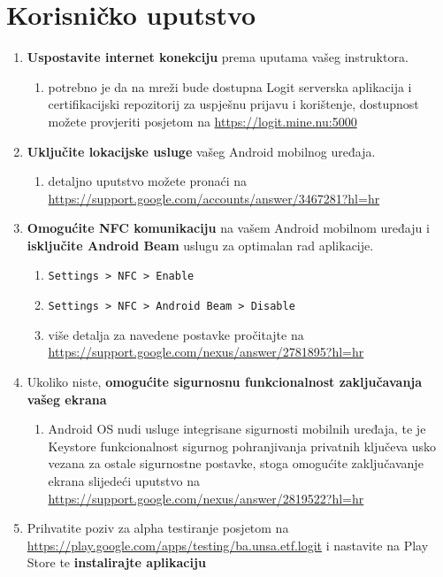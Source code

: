 \chapter{Korisničko uputstvo}
\begin{enumerate}
    \item \textbf{Uspostavite internet konekciju} prema uputama vašeg instruktora.
    \begin{enumerate}
        \item potrebno je da na mreži bude dostupna Logit serverska aplikacija i certifikacijski repozitorij za uspješnu prijavu i korištenje, dostupnost možete provjeriti posjetom na \url{https://logit.mine.nu:5000}
    \end{enumerate}
    \item \textbf{Uključite lokacijske usluge} vašeg Android mobilnog uređaja.
    \begin{enumerate}
        \item detaljno uputstvo možete pronaći na \url{https://support.google.com/accounts/answer/3467281?hl=hr}
    \end{enumerate}
    \item \textbf{Omogućite NFC komunikaciju} na vašem Android mobilnom uređaju i \textbf{isključite Android Beam} uslugu za optimalan rad aplikacije.
    \begin{enumerate}
        \item \texttt{Settings > NFC > Enable}
        \item \texttt{Settings > NFC > Android Beam > Disable}
        \item više detalja za navedene postavke pročitajte na \url{https://support.google.com/nexus/answer/2781895?hl=hr}
    \end{enumerate}
    \item Ukoliko niste, \textbf{omogućite sigurnosnu funkcionalnost zaključavanja vašeg ekrana}
    \begin{enumerate}
        \item Android OS nudi usluge integrisane sigurnosti mobilnih uređaja, te je Keystore funkcionalnost sigurnog pohranjivanja privatnih ključeva usko vezana za ostale sigurnostne postavke, stoga omogućite zaključavanje ekrana slijedeći uputstvo na \url{https://support.google.com/nexus/answer/2819522?hl=hr}
    \end{enumerate}
    \item Prihvatite poziv za alpha testiranje posjetom na \url{https://play.google.com/apps/testing/ba.unsa.etf.logit} i nastavite na Play Store te \textbf{instalirajte aplikaciju}

\end{enumerate}
